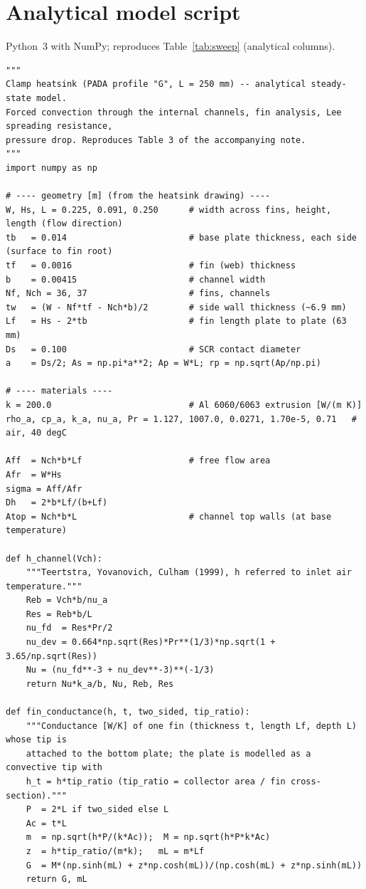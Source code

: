 \documentclass[11pt,a4paper]{article}
\begin{document}
\appendix
\section{Analytical model script}\label{app:analytic}
Python~3 with NumPy; reproduces Table~\ref{tab:sweep} (analytical columns).
\begin{lstlisting}
"""
Clamp heatsink (PADA profile "G", L = 250 mm) -- analytical steady-state model.
Forced convection through the internal channels, fin analysis, Lee spreading resistance,
pressure drop. Reproduces Table 3 of the accompanying note.
"""
import numpy as np

# ---- geometry [m] (from the heatsink drawing) ----
W, Hs, L = 0.225, 0.091, 0.250      # width across fins, height, length (flow direction)
tb   = 0.014                        # base plate thickness, each side (surface to fin root)
tf   = 0.0016                       # fin (web) thickness
b    = 0.00415                      # channel width
Nf, Nch = 36, 37                    # fins, channels
tw   = (W - Nf*tf - Nch*b)/2        # side wall thickness (~6.9 mm)
Lf   = Hs - 2*tb                    # fin length plate to plate (63 mm)
Ds   = 0.100                        # SCR contact diameter
a    = Ds/2; As = np.pi*a**2; Ap = W*L; rp = np.sqrt(Ap/np.pi)

# ---- materials ----
k = 200.0                           # Al 6060/6063 extrusion [W/(m K)]
rho_a, cp_a, k_a, nu_a, Pr = 1.127, 1007.0, 0.0271, 1.70e-5, 0.71   # air, 40 degC

Aff  = Nch*b*Lf                     # free flow area
Afr  = W*Hs
sigma = Aff/Afr
Dh   = 2*b*Lf/(b+Lf)
Atop = Nch*b*L                      # channel top walls (at base temperature)

def h_channel(Vch):
    """Teertstra, Yovanovich, Culham (1999), h referred to inlet air temperature."""
    Reb = Vch*b/nu_a
    Res = Reb*b/L
    nu_fd  = Res*Pr/2
    nu_dev = 0.664*np.sqrt(Res)*Pr**(1/3)*np.sqrt(1 + 3.65/np.sqrt(Res))
    Nu = (nu_fd**-3 + nu_dev**-3)**(-1/3)
    return Nu*k_a/b, Nu, Reb, Res

def fin_conductance(h, t, two_sided, tip_ratio):
    """Conductance [W/K] of one fin (thickness t, length Lf, depth L) whose tip is
    attached to the bottom plate; the plate is modelled as a convective tip with
    h_t = h*tip_ratio (tip_ratio = collector area / fin cross-section)."""
    P  = 2*L if two_sided else L
    Ac = t*L
    m  = np.sqrt(h*P/(k*Ac));  M = np.sqrt(h*P*k*Ac)
    z  = h*tip_ratio/(m*k);   mL = m*Lf
    G  = M*(np.sinh(mL) + z*np.cosh(mL))/(np.cosh(mL) + z*np.sinh(mL))
    return G, mL


\end{lstlisting}
\end{document}
